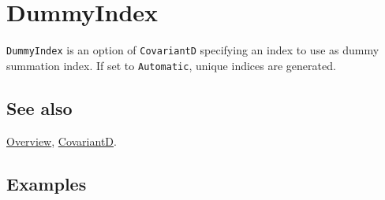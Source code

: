\documentclass[../FeynCalcManual.tex]{subfiles}
\begin{document}
\hypertarget{dummyindex}{
\section{DummyIndex}\label{dummyindex}}

\texttt{DummyIndex} is an option of \texttt{CovariantD} specifying an
index to use as dummy summation index. If set to \texttt{Automatic},
unique indices are generated.

\subsection{See also}

\hyperlink{toc}{Overview}, \hyperlink{covariantd}{CovariantD}.

\subsection{Examples}
\end{document}
